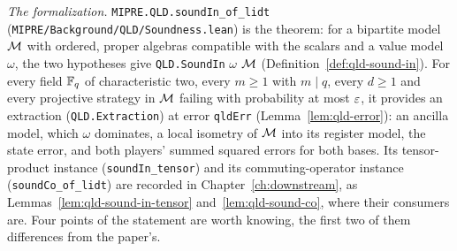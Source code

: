 \emph{The formalization.} \texttt{MIPRE.QLD.soundIn\_of\_lidt}
(\texttt{MIPRE/Background/QLD/Soundness.lean}) is the theorem: for a bipartite model $\cal{M}$ with
ordered, proper algebras compatible with the scalars and a value model $\omega$, the two
hypotheses give \texttt{QLD.SoundIn} $\omega$ $\cal{M}$ (Definition~\ref{def:qld-sound-in}). For
every field $\F_q$ of characteristic two, every $m \geq 1$ with $m \mid q$, every $d \geq 1$ and
every projective strategy in $\cal{M}$ failing with probability at most $\eps$, it provides an
extraction (\texttt{QLD.Extraction}) at error \texttt{qldErr} (Lemma~\ref{lem:qld-error}): an
ancilla model, which $\omega$
dominates, a local isometry of $\cal{M}$ into its register model, the state error, and both
players' summed squared errors for both bases. Its tensor-product instance
(\texttt{soundIn\_tensor}) and its commuting-operator instance (\texttt{soundCo\_of\_lidt}) are
recorded in Chapter~\ref{ch:downstream}, as Lemmas~\ref{lem:qld-sound-in-tensor}
and~\ref{lem:qld-sound-co}, where their consumers are. Four points of the statement are worth
knowing, the first two of them differences from the paper's.

